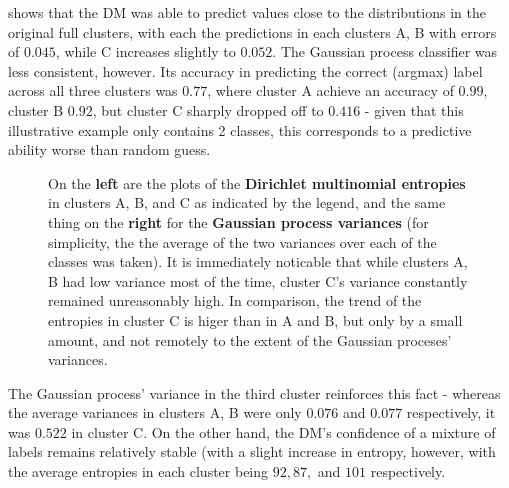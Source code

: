 
 shows that the DM was able to predict values close to the distributions in the original full clusters, with each the predictions in each clusters A, B with errors of $0.045$, while C increases slightly to $0.052$. The Gaussian process classifier was less consistent, however. Its accuracy in predicting the correct (argmax) label across all three clusters was $0.77$, where cluster A achieve an accuracy of $0.99$, cluster B $0.92$, but cluster C sharply dropped off to $0.416$ - given that this illustrative example only contains 2 classes, this corresponds to a predictive ability worse than random guess. 

\begin{figure}
    \caption{On the \textbf{left} are the plots of the \textbf{Dirichlet multinomial entropies} in clusters A, B, and C as indicated by the legend, and the same thing on the \textbf{right} for the \textbf{Gaussian process variances} (for simplicity, the the average of the two variances over each of the classes was taken). It is immediately noticable that while clusters A, B had low variance most of the time, cluster C's variance constantly remained unreasonably high. In comparison, the trend of the entropies in cluster C is higer than in A and B, but only by a small amount, and not remotely to the extent of the Gaussian proceses' variances.}
    \label{fig:dm-entr_vs_gp-vars}
\end{figure}

The Gaussian process' variance in the third cluster reinforces this fact - whereas the average variances in clusters A, B were only $0.076$ and $0.077$ respectively, it was $0.522$ in cluster C. On the other hand, the DM's confidence of a mixture of labels remains relatively stable (with a slight increase in entropy, however, with the average entropies in each cluster being $92, 87,$ and $101$ respectively.



